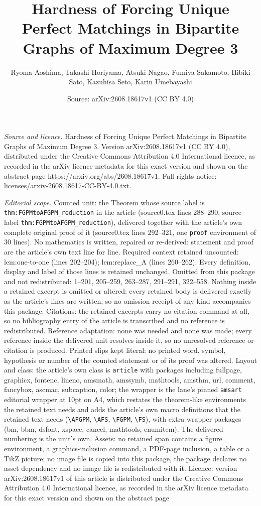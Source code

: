 \documentclass[10pt,a4paper]{amsart}
\title[Hardness of Forcing Unique Perfect Matchings in Bipartite Gr]{Hardness of Forcing Unique Perfect Matchings in Bipartite Graphs of Maximum Degree 3}
\author{Ryoma Aoshima, Takashi Horiyama, Atsuki Nagao, Fumiya Sakamoto, Hibiki Sato, Kazuhisa Seto, Karin Umebayashi}
\date{Source: arXiv:2608.18617v1 (CC BY 4.0)}
\begin{document}
\maketitle

\noindent\emph{Source and licence.} Hardness of Forcing Unique Perfect Matchings in Bipartite Graphs of Maximum Degree 3. Version arXiv:2608.18617v1 (CC BY 4.0), distributed under the Creative Commons Attribution 4.0 International licence, as recorded in the arXiv licence metadata for this exact version and shown on the abstract page https://arxiv.org/abs/2608.18617v1. Full rights notice: licenses/arxiv-2608.18617-CC-BY-4.0.txt.\par\smallskip

\noindent\textit{Editorial scope.} Counted unit: the Theorem whose source label is \texttt{thm:FGPMtoAFGPM\_reduction} in the article (source0.tex lines 288--290, source label \texttt{thm:FGPMtoAFGPM\_reduction}), delivered together with the article's own complete original proof of it (source0.tex lines 292--321, one \texttt{proof} environment of 30 lines). No mathematics is written, repaired or re-derived: statement and proof are the article's own text line for line. Required context retained uncounted: lem:one-to-one (lines 202--204); lem:replace\_A (lines 260--262). Every definition, display and label of those lines is retained unchanged. Omitted from this package and not redistributed: 1--201, 205--259, 263--287, 291--291, 322--558. Nothing inside a retained excerpt is omitted or altered: every retained body is delivered exactly as the article's lines are written, so no omission receipt of any kind accompanies this package. Citations: the retained excerpts carry no citation command at all, so no bibliography entry of the article is transcribed and no reference is redistributed. Reference adaptation: none was needed and none was made; every reference inside the delivered unit resolves inside it, so no unresolved reference or citation is produced. Printed slips kept literal: no printed word, symbol, hypothesis or number of the counted statement or of its proof was altered. Layout and class: the article's own class is \texttt{article} with packages including fullpage, graphicx, fontenc, lineno, amsmath, amssymb, mathtools, amsthm, url, comment, fancybox, ascmac, subcaption, color; the wrapper is the lane's pinned \texttt{amsart} editorial wrapper at 10pt on A4, which restates the theorem-like environments the retained text needs and adds the article's own macro definitions that the retained text needs (\texttt{\textbackslash AFGPM}, \texttt{\textbackslash AFS}, \texttt{\textbackslash FGPM}, \texttt{\textbackslash FS}), with extra wrapper packages (bm, bbm, dsfont, xspace, cancel, mathtools, enumitem). The delivered numbering is the unit's own. Assets: no retained span contains a figure environment, a graphics-inclusion command, a PDF-page inclusion, a table or a TikZ picture; no image file is copied into this package, the package declares no asset dependency and no image file is redistributed with it. Licence: version arXiv:2608.18617v1 of this article is distributed under the Creative Commons Attribution 4.0 International licence, as recorded in the arXiv licence metadata for this exact version and shown on the abstract page 
\end{document}
